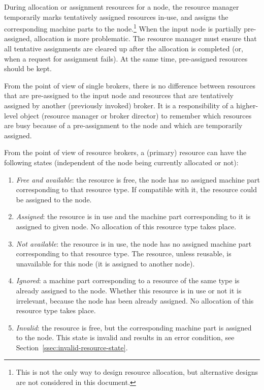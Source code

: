 \documentclass[a4paper,twoside]{tce}
\begin{document}
During allocation or assignment resources for a node, the resource manager
temporarily marks tentatively assigned resources in-use, and assigns the
corresponding machine parts to the node.\footnote{
%
  This is not the only way to design resource allocation, but alternative
  designs are not considered in this document.}
%
When the input node is partially pre-assigned, allocation is more
problematic. The resource manager must ensure that all tentative assignments
are cleared up after the allocation is completed (or, when a request for
assignment fails). At the same time, pre-assigned resources should be kept.

From the point of view of single brokers, there is no difference between
resources that are pre-assigned to the input node and resources that are
tentatively assigned by another (previously invoked) broker.
%
It is a responsibility of a higher-level object (resource manager or broker
director) to remember which resources are busy because of a pre-assignment
to the node and which are temporarily assigned.

From the point of view of resource brokers, a (primary) resource can have
the following states (independent of the node being currently allocated or
not):
\begin{enumerate}
\item %
  \emph{Free and available}: the resource is free, the node has no assigned
  machine part corresponding to that resource type. If compatible with it,
  the resource could be assigned to the node.
\item %
  \emph{Assigned}: the resource is in use and the machine part corresponding
  to it is assigned to given node. No allocation of this resource type takes
  place.
\item %
  \emph{Not available}: the resource is in use, the node has no assigned
  machine part corresponding to that resource type. The resource, unless
  reusable, is unavailable for this node (it is assigned to another node).
\item %
  \emph{Ignored}: a machine part corresponding to a resource of the same
  type is already assigned to the node. Whether this resource is in use or
  not it is irrelevant, because the node has been already assigned. No
  allocation of this resource type takes place.
\item %
  \emph{Invalid}: the resource is free, but the corresponding machine part
  is assigned to the node. This state is invalid and results in an error
  condition, see Section~\ref{ssec:invalid-resource-state}.
\end{enumerate}
\end{document}
